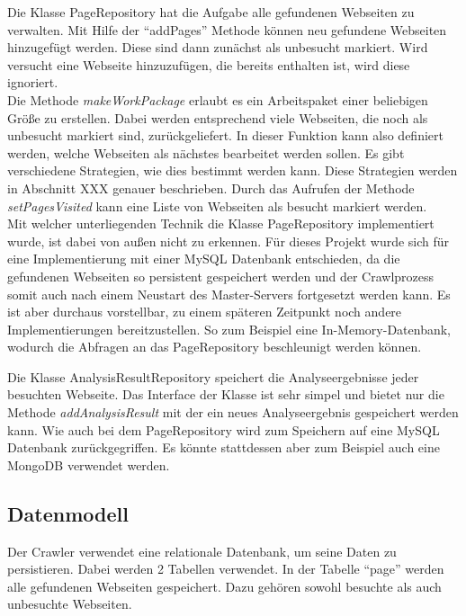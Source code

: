 Die Klasse PageRepository hat die Aufgabe alle gefundenen Webseiten zu verwalten. Mit Hilfe der \enquote{addPages} Methode können neu gefundene Webseiten hinzugefügt werden. Diese sind dann zunächst als unbesucht markiert. Wird versucht eine Webseite hinzuzufügen, die bereits enthalten ist, wird diese ignoriert.\\
Die Methode \textit{makeWorkPackage} erlaubt es ein Arbeitspaket einer beliebigen Größe zu erstellen. Dabei werden entsprechend viele Webseiten, die noch als unbesucht markiert sind, zurückgeliefert. In dieser Funktion kann also definiert werden, welche Webseiten als nächstes bearbeitet werden sollen. Es gibt verschiedene Strategien, wie dies bestimmt werden kann. Diese Strategien werden in Abschnitt XXX genauer beschrieben. Durch das Aufrufen der Methode \textit{setPagesVisited} kann eine Liste von Webseiten als besucht markiert werden. \\
Mit welcher unterliegenden Technik die Klasse PageRepository implementiert wurde, ist dabei von außen nicht zu erkennen. Für dieses Projekt wurde sich für eine Implementierung mit einer MySQL Datenbank entschieden, da die gefundenen Webseiten so persistent gespeichert werden und der Crawlprozess somit auch nach einem Neustart des Master-Servers fortgesetzt werden kann. Es ist aber durchaus vorstellbar, zu einem späteren Zeitpunkt noch andere Implementierungen bereitzustellen. So zum Beispiel eine In-Memory-Datenbank, wodurch die Abfragen an das PageRepository beschleunigt werden können.

Die Klasse AnalysisResultRepository speichert die Analyseergebnisse jeder besuchten Webseite. Das Interface der Klasse ist sehr simpel und bietet nur die Methode \textit{addAnalysisResult} mit der ein neues Analyseergebnis gespeichert werden kann. Wie auch bei dem PageRepository wird zum Speichern auf eine MySQL Datenbank zurückgegriffen. Es könnte stattdessen aber zum Beispiel auch eine MongoDB verwendet werden.

\subsection{Datenmodell}
Der Crawler verwendet eine relationale Datenbank, um seine Daten zu persistieren. Dabei werden 2 Tabellen verwendet. In der Tabelle \enquote{page} werden alle gefundenen Webseiten gespeichert. Dazu gehören sowohl besuchte als auch unbesuchte Webseiten.

